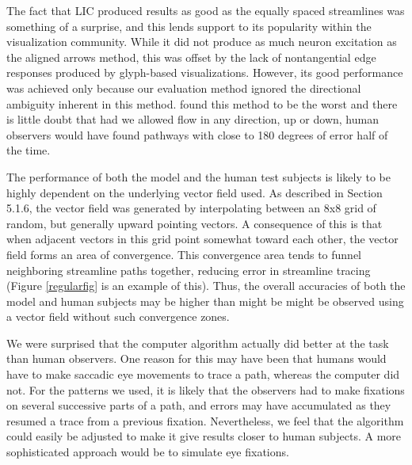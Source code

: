 \documentclass[prodmode,acmtap]{acmlarge}
\begin{document}
The fact that LIC produced results as good as the equally spaced
streamlines was something of a surprise, and this lends support to
its popularity within the visualization community. While it did not
produce as much neuron excitation as the aligned arrows method, this
was offset by the lack of nontangential edge responses produced by
glyph-based visualizations. However, its good performance was
achieved only because our evaluation method ignored the directional
ambiguity inherent in this method.  found this
method to be the worst and there is little doubt that had we allowed
flow in any direction, up or down, human observers would have found
pathways with close to 180 degrees of error half of the time.

The performance of both the model and the human test subjects is
likely to be highly dependent on the underlying vector field used.
As described in Section 5.1.6, the vector field was generated by
interpolating between an 8x8 grid of random, but generally upward
pointing vectors. A consequence of this is that when adjacent vectors
in this grid point somewhat toward each other, the vector field forms
an area of convergence. This convergence area tends to funnel
neighboring streamline paths together, reducing error in streamline
tracing (Figure \ref{regularfig} is an example of this).  Thus, the
overall accuracies of both the model and human subjects may be higher
than might be might be observed using a vector field without such convergence zones.

We were surprised that the computer algorithm actually did better at
the task than human observers. One reason for this may have been that
humans would have to make saccadic eye movements to trace a path,
whereas the computer did not. For the patterns we used, it is likely
that the observers had to make fixations on several successive parts
of a path, and errors may have accumulated as they resumed a trace
from a previous fixation. Nevertheless, we feel that the algorithm
could easily be adjusted to make it give results closer to human
subjects. A more sophisticated approach would be to simulate eye fixations.
\end{document}
